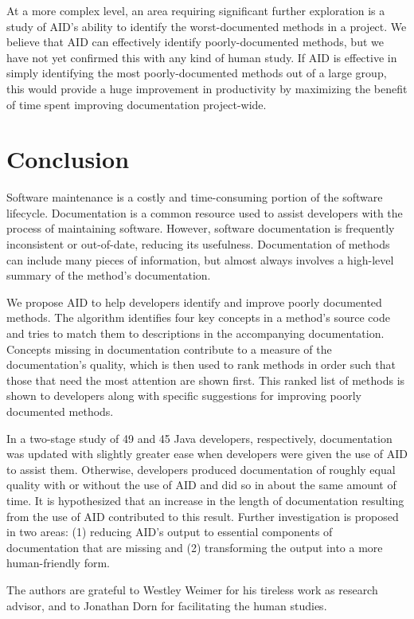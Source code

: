 \documentclass[preprint]{sigplanconf}
\begin{document}
At a more complex level, an area requiring significant further exploration is a study of AID's ability to identify the worst-documented methods in a project. We believe that AID can effectively identify poorly-documented methods, but we have not yet confirmed this with any kind of human study. If AID is effective in simply identifying the most poorly-documented methods out of a large group, this would provide a huge improvement in productivity by maximizing the benefit of time spent improving documentation project-wide.

\section{Conclusion}
Software maintenance is a costly and time-consuming portion of the software lifecycle. Documentation is a common resource used to assist developers with the process of maintaining software. However, software documentation is frequently inconsistent or out-of-date, reducing its usefulness. Documentation of methods can include many pieces of information, but almost always involves a high-level summary of the method's documentation.

We propose AID to help developers identify and improve poorly documented methods. The algorithm identifies four key concepts in a method's source code and tries to match them to descriptions in the accompanying documentation. Concepts missing in documentation contribute to a measure of the documentation's quality, which is then used to rank methods in order such that those that need the most attention are shown first. This ranked list of methods is shown to developers along with specific suggestions for improving poorly documented methods.

In a two-stage study of 49 and 45 Java developers, respectively, documentation was updated with slightly greater ease when developers were given the use of AID to assist them. Otherwise, developers produced documentation of roughly equal quality with or without the use of AID and did so in about the same amount of time. It is hypothesized that an increase in the length of documentation resulting from the use of AID contributed to this result. Further investigation is proposed in two areas: (1) reducing AID's output to essential components of documentation that are missing and (2) transforming the output into a more human-friendly form.

\acks

The authors are grateful to Westley Weimer for his tireless work as research advisor, and to Jonathan Dorn for facilitating the human studies.
\end{document}
